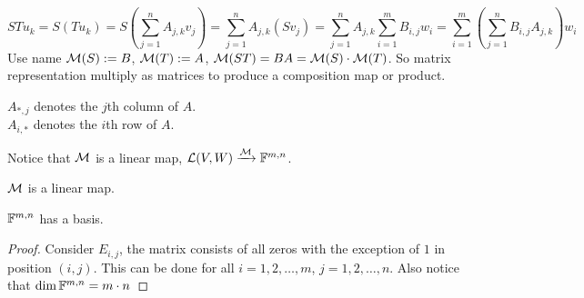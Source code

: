 \[ STu_k = S(Tu_k) = S \left( \sum_{j=1}^n A_{j,k} v_j \right) = \sum_{j = 1}^{n} A_{j,k} \left(Sv_j\right) = \sum_{j = 1}^n A_{j,k} \sum_{i = 1}^{m} B_{i,j} w_i = \sum_{i = 1}^m \left( \sum_{j = 1}^n B_{i,j}A_{j,k} \right) w_i\]
Use name $\mathcal M(S) := B$, $\mathcal M(T) := A$, $\mathcal M(ST) = BA = \mathcal M(S) \cdot \mathcal M(T)$.
So matrix representation multiply as matrices to produce a composition map or product.
\begin{remark}
    $A_{*, j}$ denotes the $j$th column of $A$. \\
    $A_{i, *}$ denotes the $i$th row of $A$.
\end{remark}
Notice that $\mathcal M$ is a linear map, $\mathcal L (V,W) \xrightarrow{\mathcal M} \mathbb F^{m,n}$. 
\begin{proposition}
    $\mathcal M$ is a linear map.
\end{proposition}

\begin{proposition}
    $\mathbb F^{m,n}$ has a basis.
\end{proposition}
\begin{proof}
    Consider $E_{i,j}$, the matrix consists of all zeros with the exception of $1$ in position $(i,j)$. This can be done for all $i = 1, 2, \ldots, m$, $j  =1,2, \ldots, n$. Also notice that $\dim \mathbb F^{m,n} = m \cdot n$
\end{proof}

